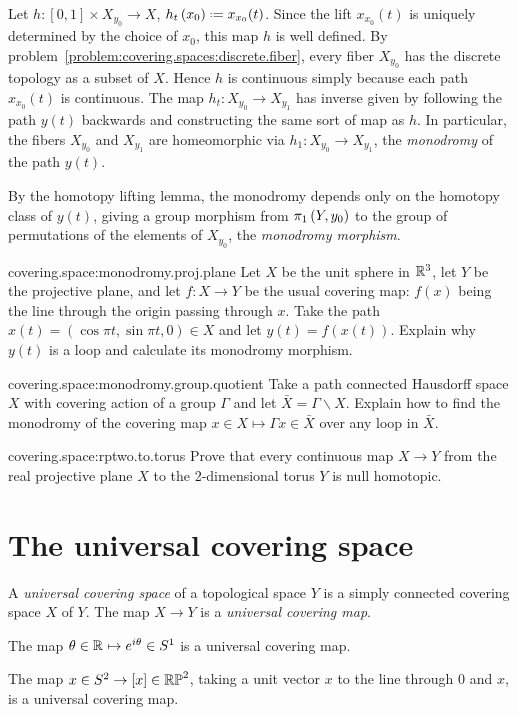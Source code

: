 Let \(h \colon [0,1] \times X_{y_0} \to X\), \(h_t\of{x_0}\defeq x_{x_0}(t)\).
Since the lift \(x_{x_0}(t)\) is uniquely determined by the choice of \(x_0\), this map \(h\) is well defined.
By problem~\vref{problem:covering.spaces:discrete.fiber}, every fiber \(X_{y_0}\) has the discrete topology as a subset of \(X\).
Hence \(h\) is continuous simply because each path \(x_{x_0}(t)\) is continuous.
The map \(h_t \colon X_{y_0} \to X_{y_1}\) has inverse given by following the path \(y(t)\) backwards and constructing the same sort of map as \(h\).
In particular, the fibers \(X_{y_0}\) and \(X_{y_1}\) are homeomorphic via \(h_1 \colon X_{y_0} \to X_{y_1}\), the \emph{monodromy} of the path \(y(t)\).

By the homotopy lifting lemma, the monodromy depends only on the homotopy class of \(y(t)\), giving a group morphism from \(\pi_{1}\left(Y,y_0\right)\) to the group of permutations of the elements of \(X_{y_0}\), the \emph{monodromy morphism}.
\begin{problem}{covering.space:monodromy.proj.plane}
Let \(X\) be the unit sphere in \(\mathbb{R}^{3}\), let \(Y\) be the projective plane, and let \(f \colon X \to Y\) be the usual covering map: \(f(x)\) being the line through the origin passing through \(x\).
Take the path \(x(t)=(\cos \pi t, \sin \pi t, 0) \in X\) and let \(y(t)=f(x(t))\).
Explain why \(y(t)\) is a loop and calculate its monodromy morphism.
\end{problem}
\begin{problem}{covering.space:monodromy.group.quotient}
Take a path connected Hausdorff space \(X\) with covering action of a group \(\Gamma\) and let \(\bar{X}=\Gamma\backslash X\).
Explain how to find the monodromy of the covering map \(x \in X \mapsto \Gamma x \in \bar{X}\) over any loop in \(\bar{X}\).
\end{problem}
\begin{problem}{covering.space:rptwo.to.torus}
Prove that every continuous map \(X \to Y\) from the real projective plane \(X\) to the 2-dimensional torus \(Y\) is null homotopic.
\end{problem}

\section{The universal covering space}
A \emph{universal covering space}%
%
%
of a topological space \(Y\) is a simply connected covering space \(X\) of \(Y\).
The map \(X \to Y\) is a \emph{universal covering map}.
\begin{example}
The map \(\theta \in \mathbb{R}^{} \mapsto e^{i \theta} \in S^1\) is a universal covering map.
\end{example}
\begin{example}
The map \(x \in S^2 \to [x] \in \mathbb{RP}^{2}\), taking a unit vector \(x\) to the line through \(0\) and \(x\), is a universal covering map.
\end{example}

